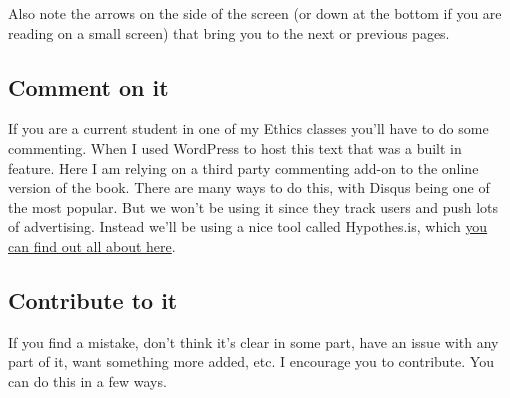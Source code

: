 \documentclass[12pt, openany]{book}
\begin{document}
Also note the arrows on the side of the screen (or down at the bottom if you are reading on a small screen) that bring you to the next or previous pages.

\hypertarget{comment-on-it}{%
\subsection*{Comment on it}\label{comment-on-it}}


If you are a current student in one of my Ethics classes you'll have to do some commenting. When I used WordPress to host this text that was a built in feature. Here I am relying on a third party commenting add-on to the online version of the book. There are many ways to do this, with Disqus being one of the most popular. But we won't be using it since they track users and push lots of advertising. Instead we'll be using a nice tool called Hypothes.is, which \protect\hyperlink{appendix-1}{you can find out all about here}.

\hypertarget{contribute}{%
\subsection*{Contribute to it}\label{contribute}}


If you find a mistake, don't think it's clear in some part, have an issue with any part of it, want something more added, etc. I encourage you to contribute. You can do this in a few ways.
\end{document}
